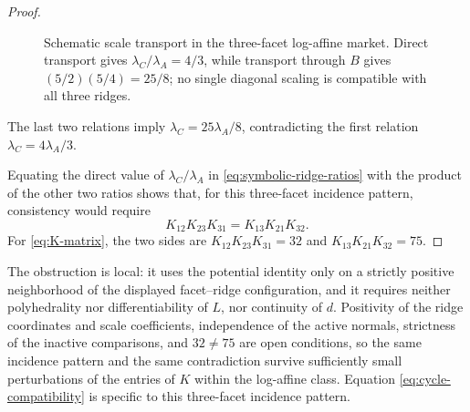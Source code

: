 \begin{proof}
\begin{figure}[tb]
\centering
{}
\caption{Schematic scale transport in the three-facet log-affine market. Direct transport gives $\lambda_C/\lambda_A=4/3$, while transport through $B$ gives $(5/2)(5/4)=25/8$; no single diagonal scaling is compatible with all three ridges.}
\label{fig:three-facet-schematic}
\end{figure}

The last two relations imply $\lambda_C=25\lambda_A/8$, contradicting the first relation $\lambda_C=4\lambda_A/3$.

Equating the direct value of $\lambda_C/\lambda_A$ in \eqref{eq:symbolic-ridge-ratios} with the product of the other two ratios shows that, for this three-facet incidence pattern, consistency would require
\begin{equation}\label{eq:cycle-compatibility}
K_{12}K_{23}K_{31}=K_{13}K_{21}K_{32}.
\end{equation}
For \eqref{eq:K-matrix}, the two sides are $K_{12}K_{23}K_{31}=32$ and $K_{13}K_{21}K_{32}=75$.
\end{proof}

The obstruction is local: it uses the potential identity only on a strictly positive neighborhood of the displayed facet--ridge configuration, and it requires neither polyhedrality nor differentiability of $L$, nor continuity of $d$. Positivity of the ridge coordinates and scale coefficients, independence of the active normals, strictness of the inactive comparisons, and $32\ne75$ are open conditions, so the same incidence pattern and the same contradiction survive sufficiently small perturbations of the entries of $K$ within the log-affine class. Equation \eqref{eq:cycle-compatibility} is specific to this three-facet incidence pattern.

